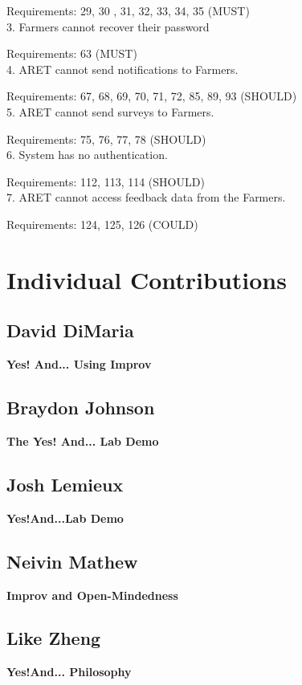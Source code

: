 \documentclass[12pt,letterpaper]{article}
\begin{document}
Requirements: 29, 30 , 31, 32, 33, 34, 35 (MUST)\\
3. \hspace{8pt} Farmers cannot recover their password

Requirements: 63 (MUST)\\ 
4. \hspace{8pt} ARET cannot send notifications to Farmers.

Requirements: 67, 68, 69, 70, 71, 72, 85, 89, 93 (SHOULD)\\
5. \hspace{8pt} ARET cannot send surveys to Farmers.

Requirements: 75, 76, 77, 78 (SHOULD)\\
6. \hspace{8pt} System has no authentication.

Requirements: 112, 113, 114 (SHOULD)\\
7. \hspace{8pt} ARET cannot access feedback data from the Farmers.

Requirements: 124, 125, 126 (COULD)


\clearpage
\section{Individual Contributions}
\subsection{David DiMaria}
\textbf{Yes! And... Using Improv}\par


\clearpage
\subsection{Braydon Johnson}
\textbf{The Yes! And... Lab Demo}\par



\clearpage
\subsection{Josh Lemieux}
\textbf{Yes!And...Lab Demo}\par



\clearpage
\subsection{Neivin Mathew}
\textbf{Improv and Open-Mindedness}\par


		
	
\clearpage
\subsection{Like Zheng}
\textbf{Yes!And... Philosophy}\par
\end{document}
